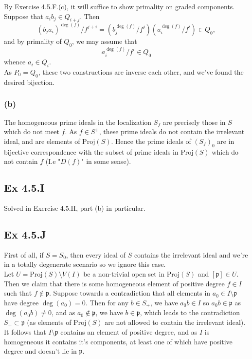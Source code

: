 \documentclass{article}
\theoremstyle{definition}
\newcommand{\Proj}{\text{Proj}}
\begin{document}
By Exercise 4.5.F.(c), it will suffice to show primality on graded components.
Suppose that $a_ib_j \in Q_{i + j}$. Then
\[
	(b_j a_i)^{\deg(f)}/f^{j + i}
	=
	\left(b_j^{\deg(f)}/f^j\right)
	\left(a_i^{\deg(f)}/f^i\right)
	\in Q_0,
\]
and by primality of $Q_0$, we may assume that
\[
	a_i^{\deg(f)}/f^i
	\in Q_0
\]
whence $a_i \in Q_i$. \\

As $P_0 = Q_0$, these two constructions are inverse each other, and we've found
the desired bijection.

\subsubsection*{(b)}

The homogeneous prime ideals in the localization $S_{f}$ are precisely those in
$S$ which do not meet $f$. As $f \in S^{+}$, these prime ideals do not contain
the irrelevant ideal, and are elements of $\Proj(S)$. Hence the prime ideals of
$(S_{f})_0$ are in bijective correspondence with the subset of prime ideals in
$\Proj(S)$ which do not contain $f$ (I.e "$D(f)$" in some sense).

\subsection*{Ex 4.5.I}

Solved in Exercise 4.5.H, part (b) in particular.

\subsection*{Ex 4.5.J}

First of all, if $S = S_0$, then every ideal of $S$ contains the irrelevant
ideal and we're in a totally degenerate scenario so we ignore this case. \\

Let $U = \Proj(S) \setminus V(I)$ be a non-trivial open set in $\Proj(S)$ and
$[\mathfrak{p}] \in U$. Then we claim that there is some homogeneous element of
positive degree $f \in I$ such that $f \not \in \mathfrak{p}$. Suppose towards a
contradiction that all elements in $a_0 \in I \setminus \mathfrak{p}$ have
degree $\deg(a_0) = 0$. Then for any $b \in S_{+}$, we have $a_0b \in I$ so
$a_0b \in \mathfrak{p}$ as $\deg(a_0b) \not = 0$, and as $a_0 \not \in
	\mathfrak{p}$, we have $b \in \mathfrak{p}$, which leads to the contradiction
$S_{+} \subset \mathfrak{p}$ (as elements of $\Proj(S)$ are not allowed to
contain the irrelevant ideal). It follows that $I \setminus \mathfrak{p}$
contains an element of positive degree, and as $I$ is homogeneous it contains
it's components, at least one of which have positive degree and doesn't lie in
$\mathfrak{p}$. \\
\end{document}
